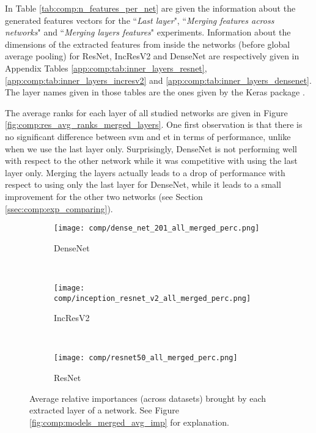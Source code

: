 In Table \ref{tab:comp:n_features_per_net} are given the information about the generated features vectors for the ``\textit{Last layer}", ``\textit{Merging features across networks}" and ``\textit{Merging layers features}" experiments. Information about the dimensions of the extracted features from inside the networks (before global average pooling) for ResNet, IncResV2 and DenseNet are respectively given in Appendix Tables \ref{app:comp:tab:inner_layers_resnet}, \ref{app:comp:tab:inner_layers_incresv2} and \ref{app:comp:tab:inner_layers_densenet}. The layer names given in those tables are the ones given by the Keras package \cite{chollet2015keras}. 

The average ranks for each layer of all studied networks are given in Figure \ref{fig:comp:res_avg_ranks_merged_layers}. One first observation is that there is no significant difference between \acrshort{svm} and \acrshort{et} in terms of performance, unlike when we use the last layer only. Surprisingly, DenseNet is not performing well with respect to the other network while it was competitive with using the last layer only. Merging the layers actually leads to a drop of performance with respect to using only the last layer for DenseNet, while it leads to a small improvement for the other two networks (see Section \ref{ssec:comp:exp_comparing}).

 
\begin{figure}
    \centering
    \begin{subfigure}[t]{0.8\textwidth}
        \centering
        \texttt{[image: comp/dense\_net\_201\_all\_merged\_perc.png]}
        \caption{DenseNet}
    \end{subfigure}\\
    \begin{subfigure}[t]{0.8\textwidth}
        \centering
        \texttt{[image: comp/inception\_resnet\_v2\_all\_merged\_perc.png]}
        \caption{IncResV2}
    \end{subfigure}\\
    \begin{subfigure}[t]{0.8\textwidth}
        \centering
        \texttt{[image: comp/resnet50\_all\_merged\_perc.png]}
        \caption{ResNet}
    \end{subfigure}
    \caption{Average relative importances (across datasets) brought by each extracted layer of a network. See Figure \ref{fig:comp:models_merged_avg_imp} for explanation.}
    \label{fig:comp:res_layers_merged_avg_imp}
\end{figure}

